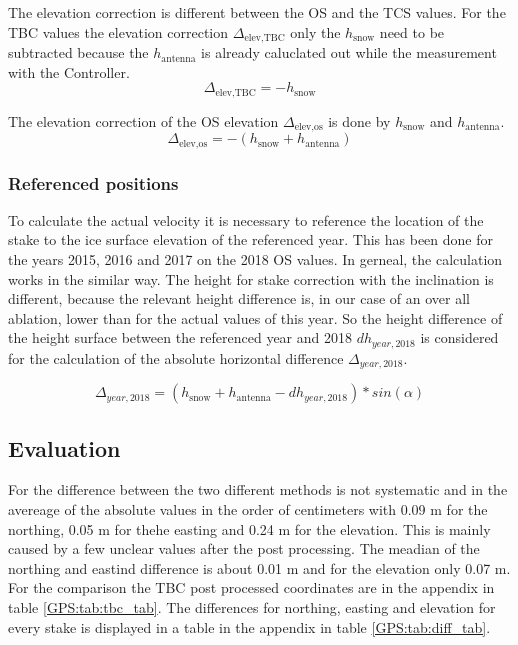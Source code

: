 The elevation correction is different between the OS and the TCS values.
For the TBC values the elevation correction $\Delta_{\text{elev,TBC}}$ only the $h_{\text{snow}}$ need to be subtracted because the $h_{\text{antenna}}$ is already caluclated out while the measurement with the Controller.
\begin{equation}
	\Delta_{\text{elev,TBC}} = - h_{\text{snow}} 
\end{equation}

The elevation correction of the OS elevation $\Delta_{\text{elev,os}}$ is done by $h_{\text{snow}}$ and $h_{\text{antenna}}$.
\begin{equation}
	\Delta_{\text{elev,os}} = - (h_{\text{snow}} + h_{\text{antenna}}) 
\end{equation}

\subsubsection*{Referenced positions}

To calculate the actual velocity it is necessary to reference the location of the stake to the ice surface elevation of the referenced year. 
This has been done for the years 2015, 2016 and 2017 on the 2018 OS values.
In gerneal, the calculation works in the similar way.
The height for stake correction with the inclination is different, because the relevant height difference is, in our case of an over all ablation, lower than for the actual values of this year. So the height difference of the height surface between the referenced year and 2018 $dh_{year,2018}$ is considered for the calculation of the absolute horizontal difference $\Delta_{year,2018}$.

\begin{equation}
	\Delta_{year,2018} = (h_{\text{snow}} + h_{\text{antenna}} - dh_{year,2018}) * sin(\alpha)
\end{equation}

\subsection{Evaluation}

For the difference between the two different methods is not systematic and in the avereage of the absolute values in the order of centimeters with 0.09 m for the northing, 0.05 m for thehe  easting and 0.24 m for the elevation. This is mainly caused by a few unclear values after the post processing. The meadian of the northing and eastind difference is about 0.01 m and for the elevation only 0.07 m. For the comparison the TBC post processed coordinates are in the appendix in table \ref{GPS:tab:tbc_tab}.
The differences for northing, easting and elevation for every stake is displayed in a table in the appendix in table \ref{GPS:tab:diff_tab}. 

